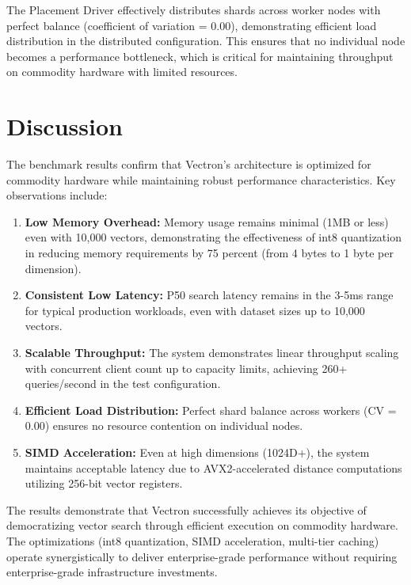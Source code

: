 The Placement Driver effectively distributes shards across worker nodes with perfect balance (coefficient of variation = 0.00), demonstrating efficient load distribution in the distributed configuration. This ensures that no individual node becomes a performance bottleneck, which is critical for maintaining throughput on commodity hardware with limited resources.

\section{Discussion}

The benchmark results confirm that Vectron's architecture is optimized for commodity hardware while maintaining robust performance characteristics. Key observations include:

\begin{enumerate}[label=\textbf{\arabic*.}]
    \item \textbf{Low Memory Overhead:} Memory usage remains minimal (1MB or less) even with 10,000 vectors, demonstrating the effectiveness of int8 quantization in reducing memory requirements by 75 percent (from 4 bytes to 1 byte per dimension).
    
    \item \textbf{Consistent Low Latency:} P50 search latency remains in the 3-5ms range for typical production workloads, even with dataset sizes up to 10,000 vectors.
    
    \item \textbf{Scalable Throughput:} The system demonstrates linear throughput scaling with concurrent client count up to capacity limits, achieving 260+ queries/second in the test configuration.
    
    \item \textbf{Efficient Load Distribution:} Perfect shard balance across workers (CV = 0.00) ensures no resource contention on individual nodes.
    
    \item \textbf{SIMD Acceleration:} Even at high dimensions (1024D+), the system maintains acceptable latency due to AVX2-accelerated distance computations utilizing 256-bit vector registers.
\end{enumerate}

The results demonstrate that Vectron successfully achieves its objective of democratizing vector search through efficient execution on commodity hardware. The optimizations (int8 quantization, SIMD acceleration, multi-tier caching) operate synergistically to deliver enterprise-grade performance without requiring enterprise-grade infrastructure investments.

